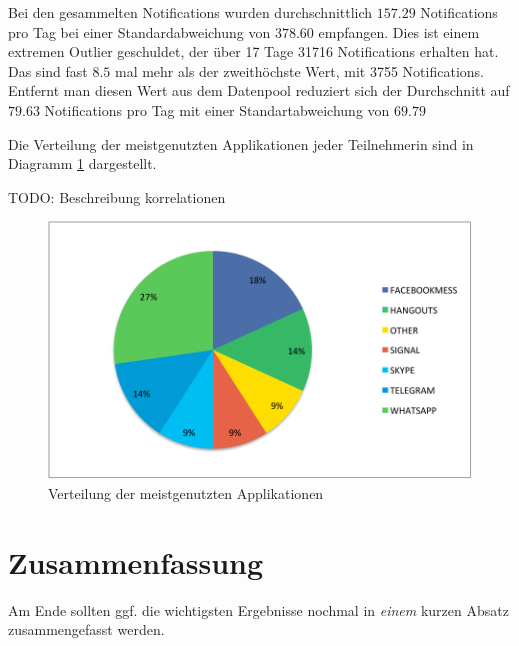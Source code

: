 Bei den gesammelten Notifications wurden durchschnittlich $157.29$ Notifications pro Tag bei einer Standardabweichung von $378.60$ empfangen.
Dies ist einem extremen Outlier geschuldet, der über 17 Tage 31716 Notifications erhalten hat. 
Das sind fast $8.5$ mal mehr als der zweithöchste Wert, mit 3755 Notifications.
Entfernt man diesen Wert aus dem Datenpool reduziert sich der Durchschnitt auf $79.63$ Notifications pro Tag mit einer Standartabweichung von $69.79$
\par
Die Verteilung der meistgenutzten Applikationen jeder Teilnehmerin sind in Diagramm \ref{fig:mostusedapp} dargestellt.
\par
TODO: Beschreibung korrelationen

\begin{figure}[h]
    \centering
    \includegraphics{images/MostUsedApp.pdf}
    \caption{Verteilung der meistgenutzten Applikationen}
    \label{fig:mostusedapp}
\end{figure}



\section{Zusammenfassung}
\label{ch:Evaluierung:sec:zusammenfassung}

Am Ende sollten ggf. die wichtigsten Ergebnisse nochmal in \emph{einem}
kurzen Absatz zusammengefasst werden.

